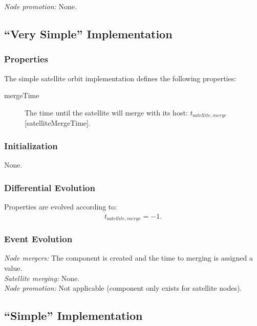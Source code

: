 \noindent\emph{Node promotion:} None.\\

\subsection{``Very Simple'' Implementation}

\subsubsection{Properties}

The simple satellite orbit implementation defines the following properties:
\begin{description}
 \item [{\normalfont \ttfamily mergeTime}] The time until the satellite will merge with its host: $t_{\mathrm satellite, merge}$ [{\normalfont \ttfamily satelliteMergeTime}].
\end{description}

\subsubsection{Initialization}

None.

\subsubsection{Differential Evolution}

Properties are evolved according to:
\begin{equation}
 \dot{t}_{\mathrm satellite, merge} = -1.
\end{equation}

\subsubsection{Event Evolution}

\noindent\emph{Node mergers:} The \gls{component} is created and the time to merging is assigned a value.\\

\noindent\emph{Satellite merging:} None.\\

\noindent\emph{Node promotion:} Not applicable (component only exists for satellite nodes).\\

\subsection{``Simple'' Implementation}\label{sec:SatelliteOrbitComponentSimple}

